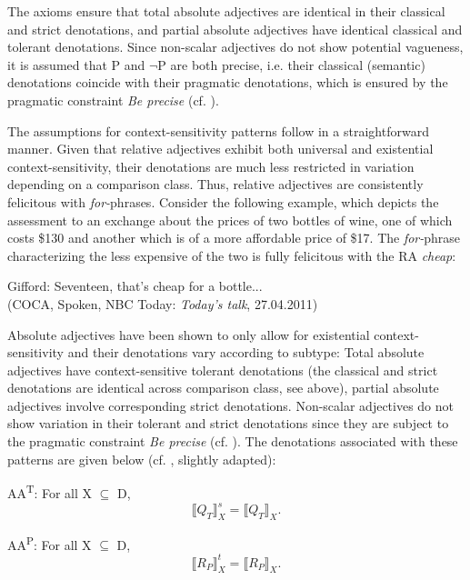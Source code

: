 \documentclass[output=paper
,modfonts
,nonflat]{langsci/langscibook}
\begin{document}
The axioms ensure that total absolute adjectives are identical in their classical and strict denotations, and partial absolute adjectives have identical classical and tolerant denotations. Since non-scalar adjectives do not show potential vagueness, it is assumed that P and $\neg$P are both precise, i.e. their classical (semantic) denotations coincide with their pragmatic denotations, which is ensured by the pragmatic constraint \textit{Be precise} (cf. \textcite[77--78]{Burnett2017}).

The assumptions for context-sensitivity patterns follow in a straightforward manner. Given that relative adjectives exhibit both universal and existential \linebreak context-sensitivity, their denotations are much less restricted in variation depending on a comparison class. Thus, relative adjectives are consistently felicitous with \textit{for-}phrases. Consider the following example, which depicts the assessment to an exchange about the prices of two bottles of wine, one of which costs \$130 and another which is of a more affordable price of \$17. The  \textit{for-}phrase characterizing the less expensive of the two is fully felicitous with the RA  \textit{cheap}: 

\begin{examples}
	\item Gifford: Seventeen, that's cheap for a bottle... \\ (COCA, Spoken, NBC Today: \textit{Today's talk}, 27.04.2011)
\end{examples}
	
Absolute adjectives have been shown to only allow for existential context-sensitivity and their denotations vary according to subtype: Total absolute adjectives have context-sensitive tolerant denotations (the classical and strict denotations are identical across comparison class, see above), partial absolute adjectives involve corresponding strict denotations. Non-scalar adjectives do not show variation in their tolerant and strict denotations since they are subject to the pragmatic constraint \textit{Be precise} (cf. \textcite[85]{Burnett2017}). The denotations associated with these patterns are given below (cf. \textcite[85]{Burnett2017}, slightly adapted):

\begin{examples}
	\item AA\textsuperscript{T}: For all X $\subseteq$ D, \[ \llbracket Q_{T} \rrbracket_X^s = \llbracket Q_{T}\rrbracket_{X}\text{.}\]
	\item AA\textsuperscript{P}: For all X $\subseteq$ D, \[\llbracket R_{P}\rrbracket_X^t = \llbracket R_{P}\rrbracket_{X}\text{.}\]
\end{examples}
\end{document}
